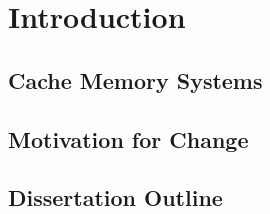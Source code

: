 
%
%

\chapter{Introduction}
\label{one}

\section{Cache Memory Systems}
\section{Motivation for Change}
\section{Dissertation Outline}